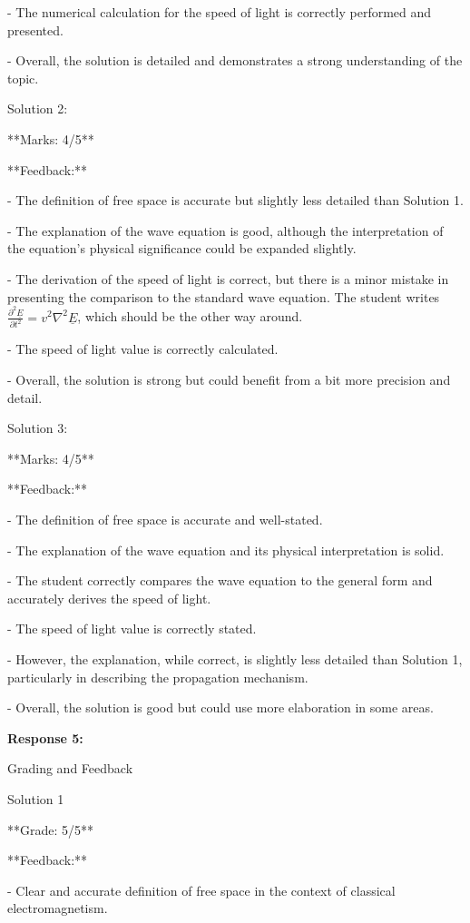 \documentclass[a4paper,11pt]{article}
\begin{document}
- The numerical calculation for the speed of light is correctly performed and presented.

- Overall, the solution is detailed and demonstrates a strong understanding of the topic.

Solution 2:

**Marks: 4/5**

**Feedback:**

- The definition of free space is accurate but slightly less detailed than Solution 1.

- The explanation of the wave equation is good, although the interpretation of the equation's physical significance could be expanded slightly.

- The derivation of the speed of light is correct, but there is a minor mistake in presenting the comparison to the standard wave equation. The student writes \(\frac{\partial^2 \underline{E}}{\partial t^{2}} = v^2 \nabla^{2}\underline{E}\), which should be the other way around.

- The speed of light value is correctly calculated.

- Overall, the solution is strong but could benefit from a bit more precision and detail.

Solution 3:

**Marks: 4/5**

**Feedback:**

- The definition of free space is accurate and well-stated.

- The explanation of the wave equation and its physical interpretation is solid.

- The student correctly compares the wave equation to the general form and accurately derives the speed of light.

- The speed of light value is correctly stated.

- However, the explanation, while correct, is slightly less detailed than Solution 1, particularly in describing the propagation mechanism.

- Overall, the solution is good but could use more elaboration in some areas.

\bigskip
\textbf{Response 5:}

Grading and Feedback

Solution 1

**Grade: 5/5**

**Feedback:**

- Clear and accurate definition of free space in the context of classical electromagnetism.
\end{document}
